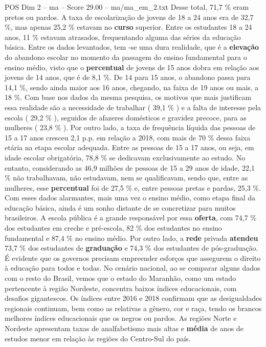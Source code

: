 \begin{textsample}{POS Dim 2 – ma – Score 29.00 – ma/ma\_em\_2.txt}
Desse total, 71,7 \% eram pretos ou pardos.
A taxa de escolarização de jovens de 18 a 24 anos era de 32,7 \%, mas apenas 25,2 \% estavam no \textbf{curso} superior.
Entre os estudantes 18 a 24 anos, 11 \% estavam atrasados, frequentando alguma das séries da educação básica.
Entre os dados levantados, tem -se uma dura realidade, que é a \textbf{elevação} do abandono escolar no momento da passagem do ensino fundamental para o ensino médio, visto que o \textbf{percentual} de jovens de 15 anos dobra em relação aos jovens de 14 anos, que é de 8,1 \%.
De 14 para 15 anos, o abandono passa para 14,1 \%, sendo ainda maior aos 16 anos, chegando, na faixa de 19 anos ou mais, a 18 \%.
Com base nos dados da mesma pesquisa, os motivos que mais justificam essa realidade são a necessidade de trabalhar ( 39,1 \% ) e a falta de interesse pela escola ( 29,2 \% ), seguidos de afazeres domésticos e gravidez precoce, para as mulheres ( 23,8 \% ).
Por outro lado, a taxa de frequência líquida das pessoas de 15 a 17 anos cresceu 2,1 p.p. em relação a 2018, com mais de 70 \% dessa faixa etária na etapa escolar adequada.
Entre as pessoas de 15 a 17 anos, ou seja, em idade escolar obrigatória, 78,8 \% se dedicavam exclusivamente ao estudo.
No entanto, considerando as 46,9 milhões de pessoas de 15 a 29 anos de idade, 22,1 \% não trabalhavam, não estudavam, nem se qualificavam, sendo que, entre as mulheres, esse \textbf{percentual} foi de 27,5 \% e, entre pessoas pretas e pardas, 25,3 \%.
Com esses dados alarmantes, mais uma vez o ensino médio, como etapa final da educação básica, ainda é um sonho distante de se concretizar para muitos brasileiros.
A escola pública é a grande responsável por essa \textbf{oferta}, com 74,7 \% dos estudantes em creche e pré-escola, 82 \% dos estudantes no ensino fundamental e 87,4 \% no ensino médio.
Por outro lado, a \textbf{rede} privada \textbf{atendeu} 73,7 \% dos estudantes de \textbf{graduação} e 74,3 \% dos estudantes de pós-graduação.
É evidente que os governos precisam empreender esforços que assegurem o direito à educação para todos e todas.
No cenário nacional, ao se comparar alguns dados com o resto do Brasil, vemos que o estado do Maranhão, como um estado pertencente à região Nordeste, concentra baixos índices educacionais, com desafios gigantescos.
Os índices entre 2016 e 2018 confirmam que as desigualdades regionais continuam, bem como as relativas a gênero, cor e raça, tendo os brancos melhores índices educacionais que os negros ou pardos.
As regiões Norte e Nordeste apresentam taxas de analfabetismo mais altas e \textbf{média} de anos de estudos menor em relação às regiões do Centro-Sul do país.

\end{textsample}
